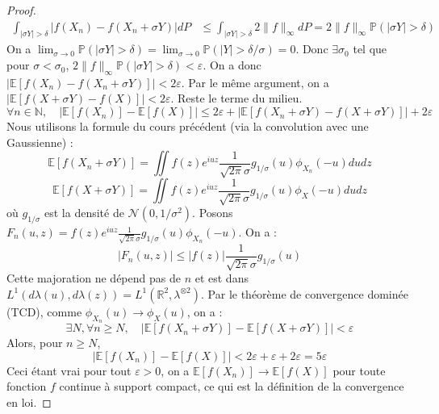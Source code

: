 \begin{proof}
\begin{align*}
    \int_{|\sigma Y| > \delta} |f(X_n) - f(X_n + \sigma Y)| dP &\leq \int_{|\sigma Y| > \delta} 2\|f\|_{\infty} dP = 2\|f\|_{\infty} \mathbb{P}(|\sigma Y| > \delta)
\end{align*}
On a $\lim_{\sigma \to 0} \mathbb{P}(|\sigma Y| > \delta) = \lim_{\sigma \to 0} \mathbb{P}(|Y| > \delta/\sigma) = 0$. Donc $\exists \sigma_0$ tel que pour $\sigma < \sigma_0$, $2\|f\|_{\infty} \mathbb{P}(|\sigma Y| > \delta) < \varepsilon$.
On a donc $|\mathbb{E}[f(X_n) - f(X_n + \sigma Y)]| < 2\varepsilon$.
Par le même argument, on a $|\mathbb{E}[f(X + \sigma Y) - f(X)]| < 2\varepsilon$.
Reste le terme du milieu.
\[
\forall n \in \mathbb{N}, \quad |\mathbb{E}[f(X_n)] - \mathbb{E}[f(X)]| \leq 2\varepsilon + |\mathbb{E}[f(X_n + \sigma Y) - f(X + \sigma Y)]| + 2\varepsilon
\]
Nous utilisons la formule du cours précédent (via la convolution avec une Gaussienne) :
\[
\mathbb{E}[f(X_n + \sigma Y)] = \iint f(z) e^{iuz} \frac{1}{\sqrt{2\pi}\sigma} g_{1/\sigma}(u) \phi_{X_n}(-u) du dz
\]
\[
\mathbb{E}[f(X + \sigma Y)] = \iint f(z) e^{iuz} \frac{1}{\sqrt{2\pi}\sigma} g_{1/\sigma}(u) \phi_{X}(-u) du dz
\]
où $g_{1/\sigma}$ est la densité de $\mathcal{N}(0, 1/\sigma^2)$.
Posons $F_n(u,z) = f(z) e^{iuz} \frac{1}{\sqrt{2\pi}\sigma} g_{1/\sigma}(u) \phi_{X_n}(-u)$. On a :
\[
|F_n(u,z)| \leq |f(z)| \frac{1}{\sqrt{2\pi}\sigma} g_{1/\sigma}(u)
\]
Cette majoration ne dépend pas de $n$ et est dans $L^1(d\lambda(u), d\lambda(z)) = L^1(\mathbb{R}^2, \lambda^{\otimes 2})$.
Par le théorème de convergence dominée (TCD), comme $\phi_{X_n}(u) \to \phi_X(u)$, on a :
\[
\exists N, \forall n \geq N, \quad |\mathbb{E}[f(X_n + \sigma Y)] - \mathbb{E}[f(X + \sigma Y)]| < \varepsilon
\]
Alors, pour $n \geq N$,
\[
|\mathbb{E}[f(X_n)] - \mathbb{E}[f(X)]| < 2\varepsilon + \varepsilon + 2\varepsilon = 5\varepsilon
\]
Ceci étant vrai pour tout $\varepsilon > 0$, on a $\mathbb{E}[f(X_n)] \to \mathbb{E}[f(X)]$ pour toute fonction $f$ continue à support compact, ce qui est la définition de la convergence en loi.
\end{proof}

